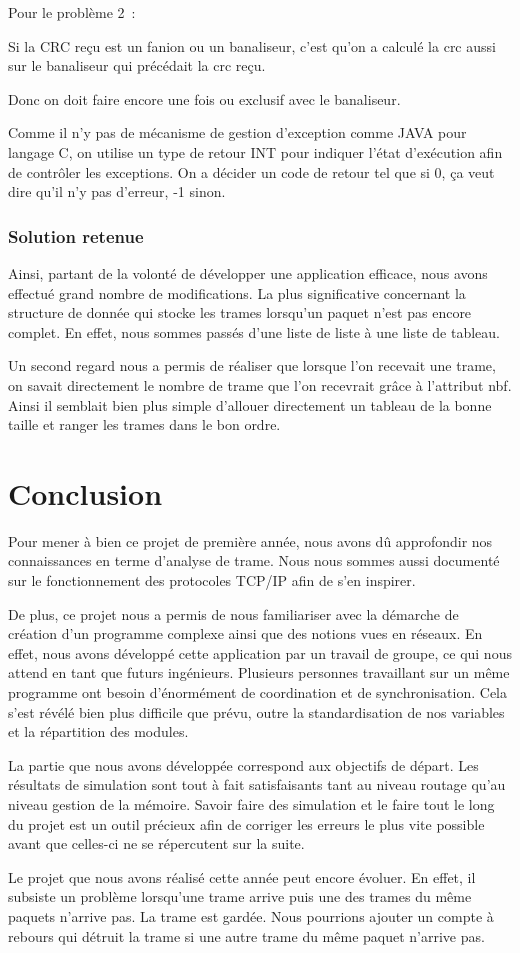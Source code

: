 \documentclass[a4paper,11pt]{article}
\begin{document}
Pour le problème 2 :

Si la CRC reçu est un fanion ou un banaliseur, c'est qu'on a
 calculé la crc aussi sur le banaliseur qui précédait la crc reçu.

Donc on doit faire encore une fois ou exclusif avec le banaliseur.


Comme il n'y pas de mécanisme de gestion d'exception comme JAVA pour langage C, on utilise un type de retour INT pour indiquer l'état d'exécution afin de contrôler les exceptions.
On a décider un code de retour tel que si 0, ça veut dire qu'il n'y pas d'erreur, -1 sinon.

\subsubsection{Solution retenue}

Ainsi, partant de la volonté de développer une application efficace, nous avons effectué grand nombre de modifications. La plus significative concernant la structure de donnée qui stocke les trames lorsqu'un paquet n'est pas encore complet. En effet, nous sommes passés d'une liste de liste à une liste de tableau.

Un second regard nous a permis de réaliser que lorsque l'on recevait une trame, on savait directement le nombre de trame que l'on recevrait grâce à l’attribut nbf. Ainsi il semblait bien plus simple d'allouer directement un tableau de la bonne taille et ranger les trames dans le bon ordre.

\section{Conclusion}

Pour mener à bien ce projet de première année, nous avons dû approfondir nos connaissances en terme d'analyse de trame. Nous nous sommes aussi documenté sur le fonctionnement des protocoles TCP/IP afin de s'en inspirer.

De plus, ce projet nous a permis de nous familiariser avec la démarche de création d’un programme complexe ainsi  que des notions vues en réseaux. En effet, nous avons développé cette application par un travail de groupe, ce qui nous attend en tant que futurs ingénieurs. Plusieurs personnes travaillant sur un même programme ont besoin d'énormément de coordination et de synchronisation. Cela s'est révélé bien plus difficile que prévu, outre la standardisation de nos variables et la répartition des modules.

La partie que nous avons développée correspond aux objectifs de départ. Les résultats de simulation sont tout à fait satisfaisants tant au niveau routage qu’au niveau gestion de la mémoire. Savoir faire des simulation et le faire tout le long du projet est un outil précieux afin de corriger les erreurs le plus vite possible avant que celles-ci ne se répercutent sur la suite.

Le projet que nous avons réalisé cette année peut encore évoluer. En effet, il subsiste un problème lorsqu'une trame arrive puis une des trames du même paquets n'arrive pas. La trame est gardée. Nous pourrions ajouter un compte à rebours qui détruit la trame si une autre trame du même paquet n'arrive pas.
\end{document}
